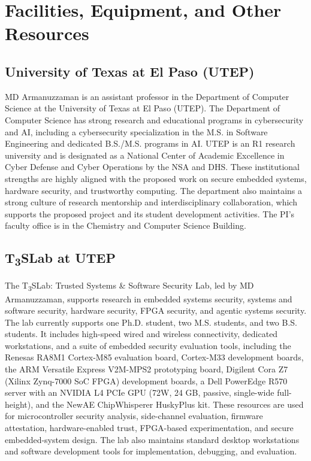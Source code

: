 \documentclass[11pt,onecolumn]{article}
\begin{document}
\let\newpage\relax

\section*{Facilities, Equipment, and Other Resources}

\subsection*{University of Texas at El Paso (UTEP)}
MD Armanuzzaman is an assistant professor in the Department of Computer Science at the University of Texas at El Paso (UTEP). The Department of Computer Science has strong research and educational programs in cybersecurity and AI, including a cybersecurity specialization in the M.S. in Software Engineering and dedicated B.S./M.S. programs in AI. UTEP is an R1 research university and is designated as a National Center of Academic Excellence in Cyber Defense and Cyber Operations by the NSA and DHS. These institutional strengths are highly aligned with the proposed work on secure embedded systems, hardware security, and trustworthy computing. The department also maintains a strong culture of research mentorship and interdisciplinary collaboration, which supports the proposed project and its student development activities. The PI's faculty office is in the Chemistry and Computer Science Building.

\subsection*{T\textsubscript{3}SLab at UTEP}
The T\textsubscript{3}SLab: Trusted Systems \& Software Security Lab, led by MD Armanuzzaman, supports research in embedded systems security, systems and software security, hardware security, FPGA security, and agentic systems security. The lab currently supports one Ph.D. student, two M.S. students, and two B.S. students. It includes high-speed wired and wireless connectivity, dedicated workstations, and a suite of embedded security evaluation tools, including the Renesas RA8M1 Cortex-M85 evaluation board, Cortex-M33 development boards, the ARM Versatile Express V2M-MPS2 prototyping board, Digilent Cora Z7 (Xilinx Zynq-7000 SoC FPGA) development boards, a Dell PowerEdge R570 server with an NVIDIA L4 PCIe GPU (72W, 24 GB, passive, single-wide full-height), and the NewAE ChipWhisperer HuskyPlus kit. These resources are used for microcontroller security analysis, side-channel evaluation, firmware attestation, hardware-enabled trust, FPGA-based experimentation, and secure embedded-system design. The lab also maintains standard desktop workstations and software development tools for implementation, debugging, and evaluation.
\end{document}
